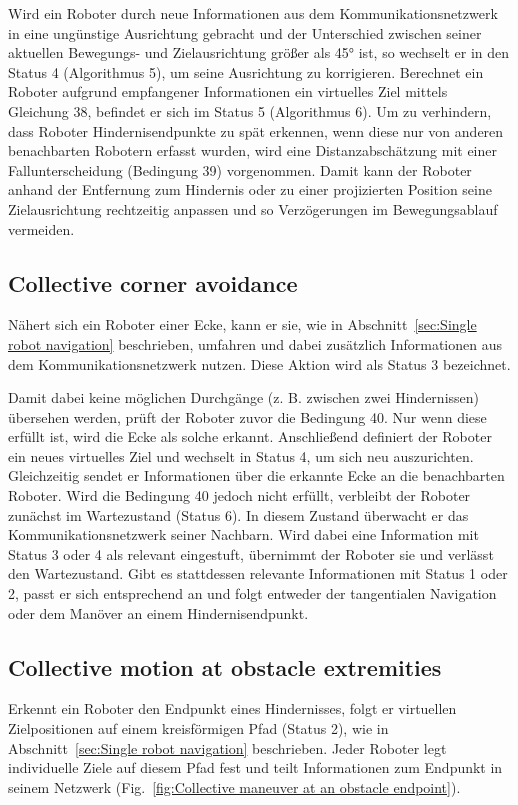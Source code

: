 \documentclass[conference]{IEEEtran}
\begin{document}
Wird ein Roboter durch neue Informationen aus dem Kommunikationsnetzwerk in eine 
ungünstige Ausrichtung gebracht und der Unterschied zwischen seiner aktuellen Bewegungs- 
und Zielausrichtung größer als 45° ist, so wechselt er in 
den Status 4 (Algorithmus 5), um seine Ausrichtung zu korrigieren.
Berechnet ein Roboter aufgrund empfangener Informationen ein virtuelles Ziel mittels 
Gleichung 38, befindet er sich im Status 5 (Algorithmus 6).
Um zu verhindern, dass Roboter Hindernisendpunkte zu spät erkennen, wenn diese nur 
von anderen benachbarten Robotern erfasst wurden, wird eine Distanzabschätzung mit 
einer Fallunterscheidung (Bedingung 39) vorgenommen. Damit kann der Roboter anhand 
der Entfernung zum Hindernis oder zu einer projizierten Position seine 
Zielausrichtung rechtzeitig anpassen und so Verzögerungen im Bewegungsablauf vermeiden.

\subsection*{Collective corner avoidance}
Nähert sich ein Roboter einer Ecke, kann er sie, wie in 
Abschnitt~\ref{sec:Single robot navigation} beschrieben, 
umfahren und dabei zusätzlich Informationen aus dem Kommunikationsnetzwerk nutzen. 
Diese Aktion wird als Status 3 bezeichnet.

Damit dabei keine möglichen Durchgänge 
(z. B. zwischen zwei Hindernissen) übersehen werden, prüft der Roboter zuvor die 
Bedingung 40. Nur wenn diese erfüllt ist, wird die Ecke als solche erkannt.
Anschließend definiert der Roboter ein neues virtuelles Ziel und wechselt in Status 4, 
um sich neu auszurichten. Gleichzeitig sendet er Informationen über die erkannte Ecke 
an die benachbarten Roboter.
Wird die Bedingung 40 jedoch nicht erfüllt, verbleibt der Roboter zunächst im 
Wartezustand (Status 6). In diesem Zustand überwacht er das Kommunikationsnetzwerk 
seiner Nachbarn. Wird dabei eine Information mit Status 3 oder 4 als relevant 
eingestuft, übernimmt der Roboter sie und verlässt den Wartezustand. Gibt es 
stattdessen relevante Informationen mit Status 1 oder 2, passt er sich entsprechend 
an und folgt entweder der tangentialen Navigation oder dem Manöver an einem Hindernisendpunkt.

\subsection*{Collective motion at obstacle extremities}
Erkennt ein Roboter den Endpunkt eines Hindernisses, folgt er virtuellen Zielpositionen 
auf einem kreisförmigen Pfad (Status 2), wie in 
Abschnitt~\ref{sec:Single robot navigation} beschrieben. Jeder 
Roboter legt individuelle Ziele auf diesem Pfad fest und teilt Informationen zum 
Endpunkt in seinem Netzwerk (Fig.~\ref{fig:Collective maneuver at an obstacle endpoint}).
\end{document}
